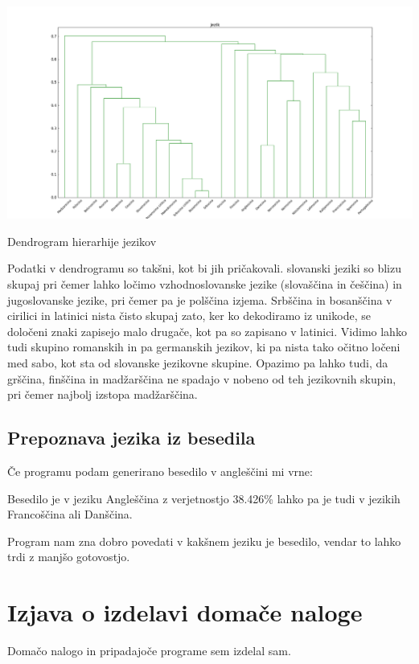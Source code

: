 \documentclass[a4paper,11pt]{article}
\begin{document}
\begin{center}
\includegraphics[scale=0.3]{dendrogram.png}
\caption{Dendrogram hierarhije jezikov}
\label{slika1}
\end{center}


Podatki v dendrogramu so takšni, kot bi jih pričakovali. slovanski jeziki so blizu skupaj pri čemer lahko ločimo vzhodnoslovanske jezike (slovaščina in češčina) in jugoslovanske jezike, pri čemer pa je polščina izjema. Srbščina in bosanščina v cirilici in latinici nista čisto skupaj zato, ker ko dekodiramo iz unikode, se določeni znaki zapisejo malo drugače, kot pa so zapisano v latinici. Vidimo lahko tudi skupino romanskih in pa germanskih jezikov, ki pa nista tako očitno ločeni med sabo, kot sta od slovanske jezikovne skupine. Opazimo pa lahko tudi, da grščina, finščina in madžarščina ne spadajo v nobeno od teh jezikovnih skupin, pri čemer najbolj izstopa madžarščina.

\subsection{Prepoznava jezika iz besedila}
Če programu podam generirano besedilo v angleščini mi vrne:\\

\begin{displayquote}
Besedilo je v jeziku Angleščina z verjetnostjo 38.426\% lahko pa je tudi v jezikih Francoščina ali Danščina.
\end{displayquote}

Program nam zna dobro povedati v kakšnem jeziku je besedilo, vendar to lahko trdi z manjšo gotovostjo.

\section{Izjava o izdelavi domače naloge}
Domačo nalogo in pripadajoče programe sem izdelal sam.
\end{document}

